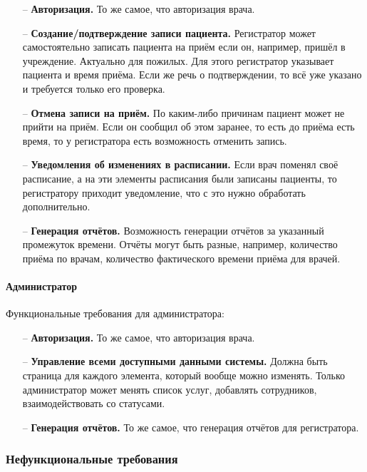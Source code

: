 \documentclass[a4paper,article]{article}
\begin{document}
\begin{sloppypar}
    \begin{itemize}[nolistsep]
        \item[--] \textbf{Авторизация.} То же самое, что авторизация врача.
        \item[--] \textbf{Создание/подтверждение записи пациента.} Регистратор может самостоятельно записать пациента на приём если он, например, пришёл в учреждение. Актуально для пожилых. Для этого регистратор указывает пациента и время приёма. Если же речь о подтверждении, то всё уже указано и требуется только его проверка.
        \item[--] \textbf{Отмена записи на приём.} По каким-либо причинам пациент может не прийти на приём. Если он сообщил об этом заранее, то есть до приёма есть время, то у регистратора есть возможность отменить запись.
        \item[--] \textbf{Уведомления об изменениях в расписании.} Если врач поменял своё расписание, а на эти элементы расписания были записаны пациенты, то регистратору приходит уведомление, что с это нужно обработать дополнительно.
        \item[--] \textbf{Генерация отчётов.} Возможность генерации отчётов за указанный промежуток времени. Отчёты могут быть разные, например, количество приёма по врачам, количество фактического времени приёма для врачей.
    \end{itemize}

    \paragraph{Администратор}\label{ТЗ. Администратор}

    Функциональные требования для администратора:

    \begin{itemize}[nolistsep]
        \item[--] \textbf{Авторизация.} То же самое, что авторизация врача.
        \item[--] \textbf{Управление всеми доступными данными системы.} Должна быть страница для каждого элемента, который вообще можно изменять. Только администратор может менять список услуг, добавлять сотрудников, взаимодействовать со статусами.
        \item[--] \textbf{Генерация отчётов.} То же самое, что генерация отчётов для регистратора.
    \end{itemize}

    \newpage

    \subsubsection{Нефункциональные требования}


\end{sloppypar}
\end{document}
